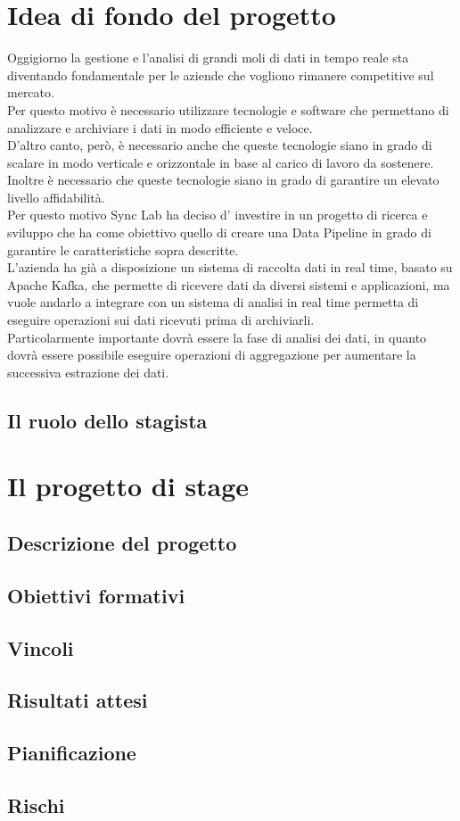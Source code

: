 \section{Idea di fondo del progetto}
Oggigiorno la gestione e l'analisi di grandi moli di dati in tempo reale sta diventando fondamentale 
per le aziende che vogliono rimanere competitive sul mercato. \\ 
Per questo motivo è necessario utilizzare tecnologie e software che permettano di analizzare e archiviare 
i dati in modo efficiente e veloce. \\
D'altro canto, però, è necessario anche che queste tecnologie siano in grado di scalare in modo verticale e orizzontale in base al carico 
di lavoro da sostenere. Inoltre è necessario che queste tecnologie siano in grado di garantire un elevato livello affidabilità. \\
Per questo motivo Sync Lab ha deciso d' investire in un progetto di ricerca e sviluppo che ha come obiettivo quello di creare 
una \gls{Data Pipeline}{} in grado di garantire le caratteristiche sopra descritte. \\
L'azienda ha già a disposizione un sistema di raccolta dati in  real time, basato su Apache Kafka, che permette di ricevere dati da
diversi sistemi e applicazioni, ma vuole andarlo a integrare con un sistema di analisi in real time permetta di eseguire operazioni 
sui dati ricevuti prima di archiviarli. \\
Particolarmente importante dovrà essere la fase di analisi dei dati, in quanto dovrà essere possibile eseguire operazioni di aggregazione
per aumentare la successiva estrazione dei dati. 
\subsection{Il ruolo dello stagista}

\section{Il progetto di stage}
\subsection{Descrizione del progetto}
\subsection{Obiettivi formativi}
\subsection{Vincoli}
\subsection{Risultati attesi}
\subsection{Pianificazione}
\subsection{Rischi}

